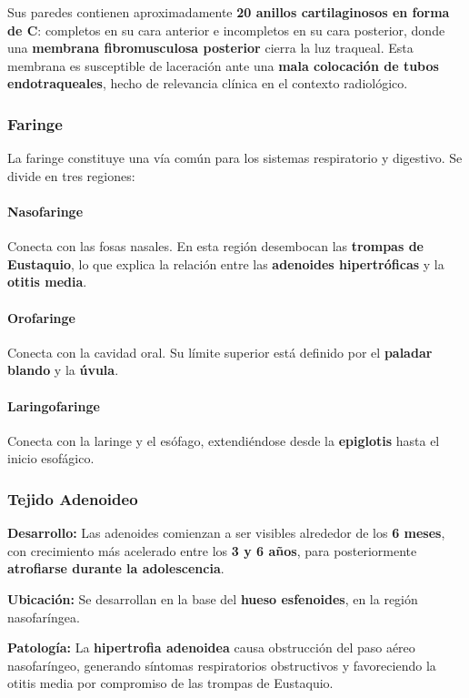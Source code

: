 		Sus paredes contienen aproximadamente \textbf{20 anillos cartilaginosos en forma de C}: completos en su cara anterior e incompletos en su cara posterior, donde una \textbf{membrana fibromusculosa posterior} cierra la luz traqueal. Esta membrana es susceptible de laceración ante una \textbf{mala colocación de tubos endotraqueales}, hecho de relevancia clínica en el contexto radiológico.
		
		\subsubsection*{Faringe}
		
		La faringe constituye una vía común para los sistemas respiratorio y digestivo. Se divide en tres regiones:
		
		\paragraph{Nasofaringe}
		Conecta con las fosas nasales. En esta región desembocan las \textbf{trompas de Eustaquio}, lo que explica la relación entre las \textbf{adenoides hipertróficas} y la \textbf{otitis media}.
		
		\paragraph{Orofaringe}
		Conecta con la cavidad oral. Su límite superior está definido por el \textbf{paladar blando} y la \textbf{úvula}.
		
		\paragraph{Laringofaringe}
		Conecta con la laringe y el esófago, extendiéndose desde la \textbf{epiglotis} hasta el inicio esofágico.
		
		\subsubsection*{Tejido Adenoideo}
		
		\textbf{Desarrollo:} Las adenoides comienzan a ser visibles alrededor de los \textbf{6 meses}, con crecimiento más acelerado entre los \textbf{3 y 6 años}, para posteriormente \textbf{atrofiarse durante la adolescencia}.
		
		\textbf{Ubicación:} Se desarrollan en la base del \textbf{hueso esfenoides}, en la región nasofaríngea.
		
		\textbf{Patología:} La \textbf{hipertrofia adenoidea} causa obstrucción del paso aéreo nasofaríngeo, generando síntomas respiratorios obstructivos y favoreciendo la otitis media por compromiso de las trompas de Eustaquio.
		

